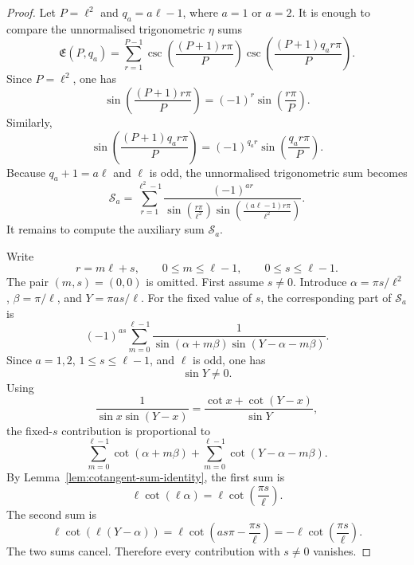 \documentclass{article}
\theoremstyle{definition}
\numberwithin{equation}{section}
\begin{document}
\begin{proof}
Let $P=\ell^2$ and $q_a=a\ell-1$, where $a=1$ or $a=2$.  It is enough to compare the unnormalised trigonometric $\eta$ sums
\begin{equation}
\mathfrak E(P,q_a)
=
\sum_{r=1}^{P-1}
\operatorname{csc}\left(\frac{(P+1)r\pi}{P}\right)
\operatorname{csc}\left(\frac{(P+1)q_a r\pi}{P}\right).
\end{equation}
Since $P=\ell^2$, one has
\begin{equation}
\sin\left(\frac{(P+1)r\pi}{P}\right)=(-1)^r\sin\left(\frac{r\pi}{P}\right).
\end{equation}
Similarly,
\begin{equation}
\sin\left(\frac{(P+1)q_a r\pi}{P}\right)=(-1)^{q_a r}\sin\left(\frac{q_a r\pi}{P}\right).
\end{equation}
Because $q_a+1=a\ell$ and $\ell$ is odd, the unnormalised trigonometric sum becomes
\begin{equation}
\mathcal S_a
=
\sum_{r=1}^{\ell^2-1}
\frac{(-1)^{ar}}{
\sin\left(\frac{r\pi}{\ell^2}\right)
\sin\left(\frac{(a\ell-1)r\pi}{\ell^2}\right)}.
\end{equation}
It remains to compute the auxiliary sum $\mathcal S_a$.

Write
\begin{equation}
r=m\ell+s,
\qquad
0\leq m\leq \ell-1,
\qquad
0\leq s\leq \ell-1.
\end{equation}
The pair $(m,s)=(0,0)$ is omitted.  First assume $s\neq 0$.  Introduce $\alpha=\pi s/\ell^2$, $\beta=\pi/\ell$, and $Y=\pi as/\ell$.
For the fixed value of $s$, the corresponding part of $\mathcal S_a$ is
\begin{equation}
(-1)^{as}
\sum_{m=0}^{\ell-1}
\frac{1}{\sin(\alpha+m\beta)\sin(Y-\alpha-m\beta)}.
\end{equation}
Since $a=1,2$, $1\leq s\leq\ell-1$, and $\ell$ is odd, one has
\begin{equation}
\sin Y\neq 0.
\end{equation}
Using
\begin{equation}
\frac{1}{\sin x\sin(Y-x)}
=
\frac{\cot x+\cot(Y-x)}{\sin Y},
\end{equation}
the fixed-$s$ contribution is proportional to
\begin{equation}
\sum_{m=0}^{\ell-1}\cot(\alpha+m\beta)
+
\sum_{m=0}^{\ell-1}\cot(Y-\alpha-m\beta).
\end{equation}
By Lemma~\ref{lem:cotangent-sum-identity}, the first sum is
\begin{equation}
\ell\cot(\ell\alpha)=\ell\cot\left(\frac{\pi s}{\ell}\right).
\end{equation}
The second sum is
\begin{equation}
\ell\cot(\ell(Y-\alpha))
=
\ell\cot\left(as\pi-\frac{\pi s}{\ell}\right)
=
-\ell\cot\left(\frac{\pi s}{\ell}\right).
\end{equation}
The two sums cancel.  Therefore every contribution with $s\neq 0$ vanishes.


\end{proof}
\end{document}
